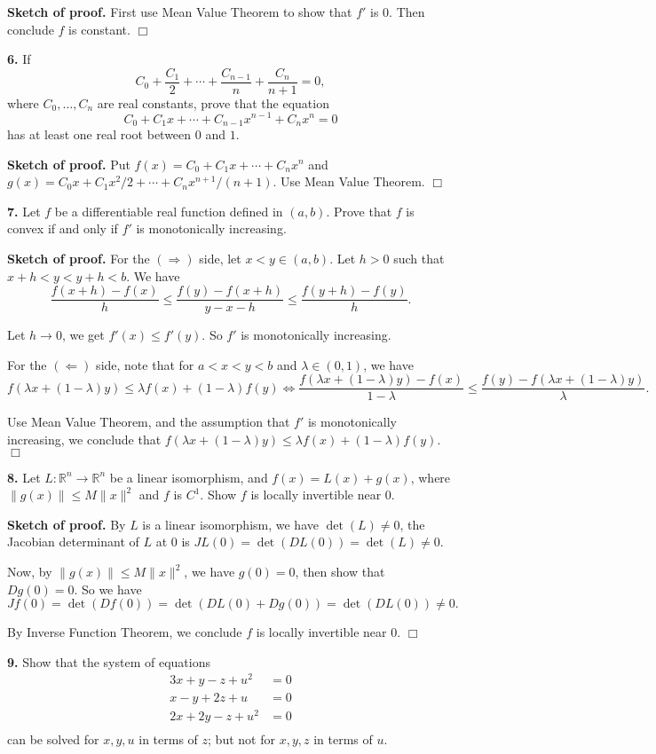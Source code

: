 \documentclass{article}
\begin{document}
    \textbf{Sketch of proof.} First use Mean Value Theorem to show that $f'$
is $0$. Then conclude $f$ is constant. $\Box$

    \textbf{6.} If
\[C_0 + \frac{C_1}{2} + \cdots + \frac{C_{n-1}}{n} + \frac{C_n}{n+1} = 0,\]
where $C_0,\ldots,C_n$ are real constants, prove that the equation
\[C_0 + C_1x + \cdots + C_{n-1} x^{n-1} + C_nx^n = 0\] has at least one
real root between $0$ and $1$.

    \textbf{Sketch of proof.} Put $f(x) = C_0 + C_1x + \cdots +  C_nx^n$ and
$g(x) = C_0 x + C_1 x^2/2 + \cdots + C_nx^{n+1}/(n+1)$. Use Mean Value
Theorem. $\Box$

    \textbf{7.} Let $f$ be a differentiable real function defined in
$(a,b)$. Prove that $f$ is convex if and only if $f'$ is monotonically
increasing.

    \textbf{Sketch of proof.} For the $(\Rightarrow)$ side, let
$x< y \in (a,b)$. Let $h > 0$ such that $x + h < y < y+h < b$. We have
\[\frac{f(x+h) - f(x)}{h} \le \frac{f(y)-f(x+h)}{y -x-h} \le \frac{f(y+h)-f(y)}{h}.\]

Let $h \to 0$, we get $f'(x) \le f'(y)$. So $f'$ is monotonically
increasing.

For the $(\Leftarrow)$ side, note that for $a < x < y < b$ and
$\lambda \in (0,1)$, we have
\[f(\lambda x + (1-\lambda)y) \le \lambda f(x) + (1-\lambda) f(y) \iff \frac{f(\lambda x + (1-\lambda)y) - f(x)}{1-\lambda} \le \frac{f(y) -f(\lambda x + (1-\lambda)y) }{\lambda}.\]

Use Mean Value Theorem, and the assumption that $f'$ is monotonically
increasing, we conclude that
$f(\lambda x + (1-\lambda)y) \le \lambda f(x) + (1-\lambda) f(y)$.
$\Box$

    \textbf{8.} Let $L:\mathbb{R}^n \to \mathbb{R}^n$ be a linear
isomorphism, and $f(x) = L(x) + g(x)$, where $\|g(x)\| \le M \|x\|^2$
and $f$ is $C^1$. Show $f$ is locally invertible near $0$.

    \textbf{Sketch of proof.} By $L$ is a linear isomorphism, we have
$\det (L) \ne 0$, the Jacobian determinant of $L$ at $0$ is
$JL(0) = \det(DL(0)) = \det(L) \ne 0$.

Now, by $\|g(x)\| \le M\|x\|^2$, we have $g(0) = 0$, then show that
$Dg(0) = 0$. So we have
\[Jf(0) = \det(Df(0)) = \det(DL(0) + Dg(0)) = \det(DL(0)) \ne 0.\]

By Inverse Function Theorem, we conclude $f$ is locally invertible near
$0$. $\Box$

    \textbf{9.} Show that the system of equations \[\begin{aligned}
3x+y -z + u^2 &= 0\\
x-y+2z+u &= 0\\
2x+2y - z + u^2 &= 0\\
\end{aligned}\] can be solved for $x,y,u$ in terms of $z$; but not for
$x,y,z$ in terms of $u$.
\end{document}
